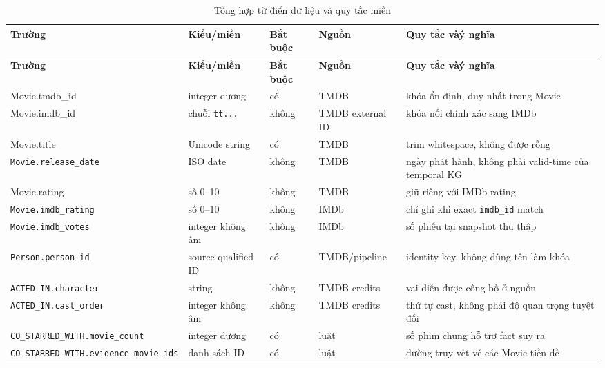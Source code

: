 \begin{longtable}{|>{\raggedright\arraybackslash}p{}|>{\raggedright\arraybackslash}p{}|>{\raggedright\arraybackslash}p{}|>{\raggedright\arraybackslash}p{}|>{\raggedright\arraybackslash}p{}|}
\caption{Tổng hợp từ điển dữ liệu và quy tắc miền}\label{tab:3-4} \\
\hline
\textbf{Trường} & \textbf{Kiểu/miền} & \textbf{Bắt buộc} & \textbf{Nguồn} & \textbf{Quy tắc và\linebreak{}ý nghĩa} \\ \hline
\endfirsthead\hline \textbf{Trường} & \textbf{Kiểu/miền} & \textbf{Bắt buộc} & \textbf{Nguồn} & \textbf{Quy tắc và\linebreak{}ý nghĩa} \\ \hline\endhead
Movie.tmdb\_id & integer dương & có & TMDB & khóa ổn định, duy nhất trong Movie \\ \hline
Movie.imdb\_id & chuỗi \texttt{tt...} & không & TMDB external ID & khóa nối chính xác sang IMDb \\ \hline
Movie.title & Unicode string & có & TMDB & trim whitespace, không được rỗng \\ \hline
\texttt{Movie.}\linebreak{}\texttt{release\_date} & ISO date & không & TMDB & ngày phát hành, không phải valid-time của temporal KG \\ \hline
Movie.rating & số 0–10 & không & TMDB & giữ riêng với IMDb rating \\ \hline
\texttt{Movie.}\linebreak{}\texttt{imdb\_rating} & số 0–10 & không & IMDb & chỉ ghi khi exact \texttt{imdb\_id} match \\ \hline
\texttt{Movie.}\linebreak{}\texttt{imdb\_votes} & integer không âm & không & IMDb & số phiếu tại snapshot thu thập \\ \hline
\texttt{Person.}\linebreak{}\texttt{person\_id} & source-qualified ID & có & TMDB/\linebreak{}pipeline & identity key, không dùng tên làm khóa \\ \hline
\texttt{ACTED\_IN.}\linebreak{}\texttt{character} & string & không & TMDB credits & vai diễn được công bố ở nguồn \\ \hline
\texttt{ACTED\_IN.}\linebreak{}\texttt{cast\_order} & integer không âm & không & TMDB credits & thứ tự cast, không phải độ quan trọng tuyệt đối \\ \hline
\texttt{CO\_STARRED\_WITH.}\linebreak{}\texttt{movie\_count} & integer dương & có & luật & số phim chung hỗ trợ fact suy ra \\ \hline
\texttt{CO\_STARRED\_WITH.}\linebreak{}\texttt{evidence\_}\linebreak{}\texttt{movie\_ids} & danh sách ID & có & luật & đường truy vết về các Movie tiền đề \\ \hline
\end{longtable}

